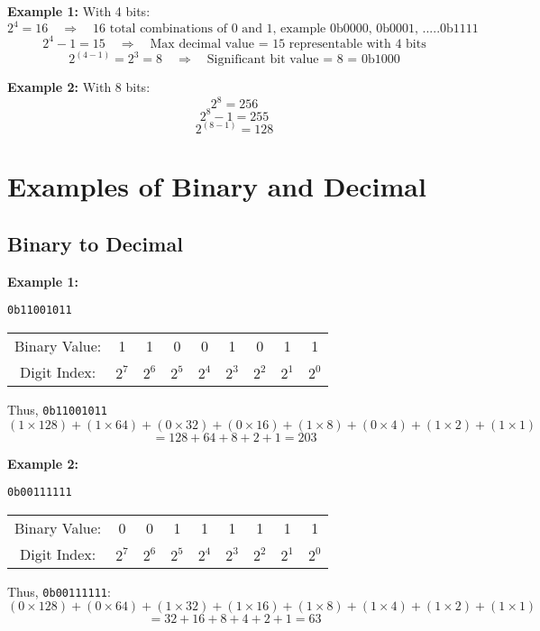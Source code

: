 \documentclass{article}
\begin{document}
\textbf{Example 1:} With 4 bits:  
\[
2^4 = 16 \quad \Rightarrow \quad \text{16 total combinations of 0 and 1, example 0b0000, 0b0001, .....0b1111}
\]
\[
2^4 - 1 = 15 \quad \Rightarrow \quad \text{Max decimal value = 15 representable with 4 bits}
\]
\[
2^{(4-1)} = 2^3 = 8 \quad \Rightarrow \quad \text{Significant bit value = 8 = 0b1000}
\]

\textbf{Example 2:} With 8 bits:
\[
2^8 = 256
\]
\[	
2^8 - 1 = 255
\]
\[
2^{(8-1)} = 128
\]

\section{Examples of Binary and Decimal}

\subsection*{Binary to Decimal}
\textbf{Example 1:}

\texttt{0b11001011}

\begin{center}
\begin{tabular}{c c c c c c c c c}
Binary Value: & 1 & 1 & 0 & 0 & 1 & 0 & 1 & 1 \\
Digit Index:  & $2^7$ & $2^6$ & $2^5$ & $2^4$ & $2^3$ & $2^2$ & $2^1$ & $2^0$ \\
\end{tabular}
\end{center} 

\noindent Thus, \texttt{0b11001011}
\[
(1 \times 128) + (1 \times 64) + (0 \times 32) + (0 \times 16) + (1 \times 8) + (0 \times 4) + (1 \times 2) + (1 \times 1)
\]
\[
= 128 + 64 + 8 + 2 + 1 = 203
\]


\noindent \textbf{Example 2:}

\texttt{0b00111111}

\begin{center}
\begin{tabular}{c c c c c c c c c}
Binary Value: & 0 & 0 & 1 & 1 & 1 & 1 & 1 & 1 \\
Digit Index:  & $2^7$ & $2^6$ & $2^5$ & $2^4$ & $2^3$ & $2^2$ & $2^1$ & $2^0$ \\
\end{tabular}
\end{center} 

\noindent Thus, \texttt{0b00111111}:
\[
(0 \times 128) + (0 \times 64) + (1 \times 32) + (1 \times 16) + (1 \times 8) + (1 \times 4) + (1 \times 2) + (1 \times 1)
\]
\[
= 32 + 16 + 8 + 4 + 2 + 1 = 63
\]
\end{document}
